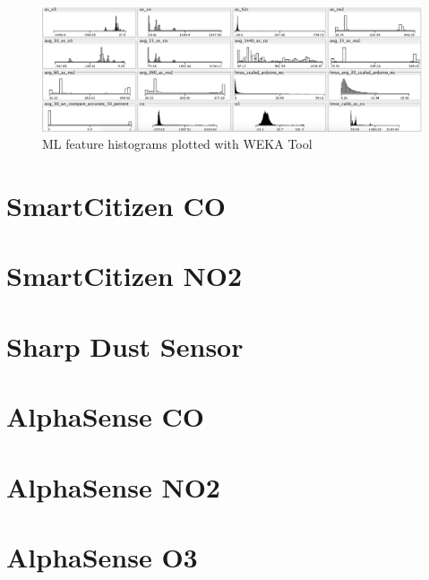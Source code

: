 \begin{figure}[htb]
	\includegraphics[width=\textwidth]{weka/features4}                 
         \caption{ML feature histograms plotted with WEKA Tool}
 	 \label{fig:weka_features}
\end{figure}

\FloatBarrier
\section{SmartCitizen CO}
\FloatBarrier

\FloatBarrier
\section{SmartCitizen NO2}
\FloatBarrier

\FloatBarrier
\section{Sharp Dust Sensor}
\FloatBarrier

\FloatBarrier
\section{AlphaSense CO}
\FloatBarrier

\FloatBarrier
\section{AlphaSense NO2}
\FloatBarrier

\FloatBarrier
\section{AlphaSense O3}
\FloatBarrier

\clearpage
\newpage
